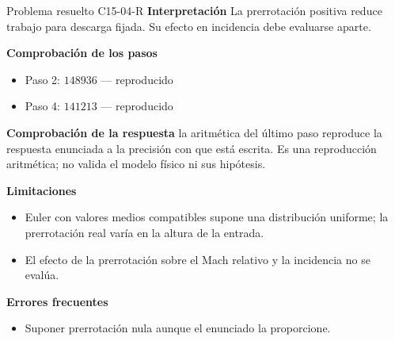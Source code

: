 \documentclass[10pt,openany]{book}
\begin{document}
\begin{studiumworked}{Problema resuelto C15-04-R}
\noindent\textbf{Interpretación}
La prerrotación positiva reduce trabajo para descarga fijada. Su efecto en incidencia debe evaluarse aparte.

\noindent\textbf{Comprobación de los pasos}
\begin{itemize}
\item Paso 2: $148936$ — reproducido
\item Paso 4: $141213$ — reproducido
\end{itemize}

\noindent\textbf{Comprobación de la respuesta} la aritmética del último paso reproduce la respuesta enunciada a la precisión con que está escrita. Es una reproducción aritmética; no valida el modelo físico ni sus hipótesis.

\noindent\textbf{Limitaciones}
\begin{itemize}
\item Euler con valores medios compatibles supone una distribución uniforme; la prerrotación real varía en la altura de la entrada.
\item El efecto de la prerrotación sobre el Mach relativo y la incidencia no se evalúa.
\end{itemize}

\noindent\textbf{Errores frecuentes}
\begin{itemize}
\item Suponer prerrotación nula aunque el enunciado la proporcione.
\end{itemize}
\end{studiumworked}
\end{document}
